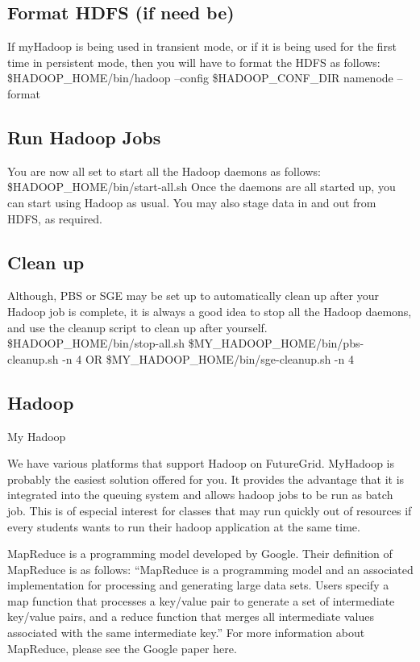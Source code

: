 \subsection{Format HDFS (if need be)}

If myHadoop is being used in transient mode, or if it is being used for the first time in
persistent mode, then you will have to format the HDFS as follows:
\$HADOOP\_HOME/bin/hadoop --config \$HADOOP\_CONF\_DIR namenode –format

\subsection{Run Hadoop Jobs}

You are now all set to start all the Hadoop daemons as follows:
\$HADOOP\_HOME/bin/start-all.sh
Once the daemons are all started up, you can start using Hadoop as usual. You may also
stage data in and out from HDFS, as required.

\subsection{Clean up}

Although, PBS or SGE may be set up to automatically clean up after your Hadoop job is
complete, it is always a good idea to stop all the Hadoop daemons, and use the cleanup
script to clean up after yourself.
\$HADOOP\_HOME/bin/stop-all.sh
\$MY\_HADOOP\_HOME/bin/pbs-cleanup.sh -n 4 OR
\$MY\_HADOOP\_HOME/bin/sge-cleanup.sh -n 4


\subsection{Hadoop}

My Hadoop

We have various platforms that support Hadoop on FutureGrid. MyHadoop is probably the easiest solution offered for you. It provides the advantage that it is integrated into the queuing system and allows hadoop jobs to be run as batch job. This is of especial interest for classes that may run quickly out of resources if every students wants to run their hadoop application at the same time.



MapReduce is a programming model developed by Google. Their definition of MapReduce is as follows: “MapReduce is a programming model and an associated implementation for processing and generating large data sets. Users specify a map function that processes a key/value pair to generate a set of intermediate key/value pairs, and a reduce function that merges all intermediate values associated with the same intermediate key.” For more information about MapReduce, please see the Google paper here.

